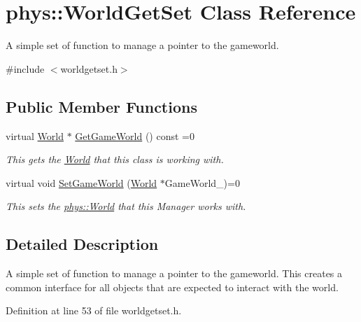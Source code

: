 \hypertarget{classphys_1_1WorldGetSet}{
\section{phys::WorldGetSet Class Reference}
\label{dc/d4f/classphys_1_1WorldGetSet}
}


A simple set of function to manage a pointer to the gameworld.  




{\ttfamily \#include $<$worldgetset.h$>$}

\subsection*{Public Member Functions}
\begin{DoxyCompactItemize}
\item 
virtual \hyperlink{classphys_1_1World}{World} $\ast$ \hyperlink{classphys_1_1WorldGetSet_ae11f48a9152834423647ea44e7fd7ee5}{GetGameWorld} () const =0
\begin{DoxyCompactList}\small\item\em This gets the \hyperlink{classphys_1_1World}{World} that this class is working with. \item\end{DoxyCompactList}\item 
\hypertarget{classphys_1_1WorldGetSet_a03f596502ff3436f249169833ae7f9c6}{
virtual void \hyperlink{classphys_1_1WorldGetSet_a03f596502ff3436f249169833ae7f9c6}{SetGameWorld} (\hyperlink{classphys_1_1World}{World} $\ast$GameWorld\_\-)=0}
\label{dc/d4f/classphys_1_1WorldGetSet_a03f596502ff3436f249169833ae7f9c6}

\begin{DoxyCompactList}\small\item\em This sets the \hyperlink{classphys_1_1World}{phys::World} that this Manager works with. \item\end{DoxyCompactList}\end{DoxyCompactItemize}


\subsection{Detailed Description}
A simple set of function to manage a pointer to the gameworld. This creates a common interface for all objects that are expected to interact with the world. 

Definition at line 53 of file worldgetset.h.



